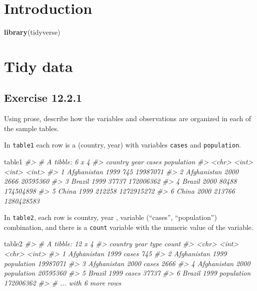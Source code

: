 \documentclass[]{book}
\newenvironment{Shaded}{\begin{snugshade}}{\end{snugshade}}
\newcommand{\CommentTok}[1]{\textcolor[rgb]{0.56,0.35,0.01}{\textit{#1}}}
\newcommand{\KeywordTok}[1]{\textcolor[rgb]{0.13,0.29,0.53}{\textbf{#1}}}
\newcommand{\NormalTok}[1]{#1}
\theoremstyle{plain}
\theoremstyle{remark}
\theoremstyle{definition}
\theoremstyle{definition}
\theoremstyle{definition}
\theoremstyle{remark}
\begin{document}
\hypertarget{introduction-7}{%
\section{Introduction}\label{introduction-7}}

\begin{Shaded}
\begin{Highlighting}[]
\KeywordTok{library}\NormalTok{(tidyverse)}
\end{Highlighting}
\end{Shaded}

\hypertarget{tidy-data-1}{%
\section{Tidy data}\label{tidy-data-1}}

\hypertarget{exercise-12.2.1}{%
\subsection*{\texorpdfstring{Exercise
{12.2.1}}{Exercise 12.2.1}}\label{exercise-12.2.1}}

Using prose, describe how the variables and observations are organized
in each of the sample tables.

In \texttt{table1} each row is a (country, year) with variables
\texttt{cases} and \texttt{population}.

\begin{Shaded}
\begin{Highlighting}[]
\NormalTok{table1}
\CommentTok{#> # A tibble: 6 x 4}
\CommentTok{#>   country      year  cases population}
\CommentTok{#>   <chr>       <int>  <int>      <int>}
\CommentTok{#> 1 Afghanistan  1999    745   19987071}
\CommentTok{#> 2 Afghanistan  2000   2666   20595360}
\CommentTok{#> 3 Brazil       1999  37737  172006362}
\CommentTok{#> 4 Brazil       2000  80488  174504898}
\CommentTok{#> 5 China        1999 212258 1272915272}
\CommentTok{#> 6 China        2000 213766 1280428583}
\end{Highlighting}
\end{Shaded}

In \texttt{table2}, each row is country, year , variable (``cases'',
``population'') combination, and there is a \texttt{count} variable with
the numeric value of the variable.

\begin{Shaded}
\begin{Highlighting}[]
\NormalTok{table2}
\CommentTok{#> # A tibble: 12 x 4}
\CommentTok{#>   country      year type           count}
\CommentTok{#>   <chr>       <int> <chr>          <int>}
\CommentTok{#> 1 Afghanistan  1999 cases            745}
\CommentTok{#> 2 Afghanistan  1999 population  19987071}
\CommentTok{#> 3 Afghanistan  2000 cases           2666}
\CommentTok{#> 4 Afghanistan  2000 population  20595360}
\CommentTok{#> 5 Brazil       1999 cases          37737}
\CommentTok{#> 6 Brazil       1999 population 172006362}
\CommentTok{#> # ... with 6 more rows}
\end{Highlighting}
\end{Shaded}
\end{document}
